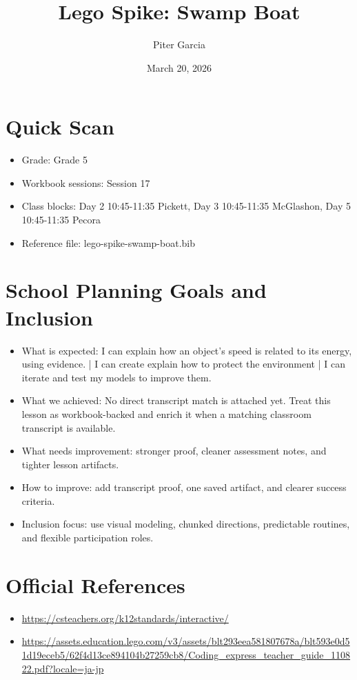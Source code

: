 \documentclass[11pt]{article}
\title{Lego Spike: Swamp Boat}
\author{Piter Garcia}
\date{March 20, 2026}
\begin{document}
    \maketitle
    \section*{Quick Scan}
    \begin{itemize}[leftmargin=*]
    \item Grade: Grade 5
    \item Workbook sessions: Session 17
    \item Class blocks: Day 2 10:45-11:35 Pickett, Day 3 10:45-11:35 McGlashon, Day 5 10:45-11:35 Pecora
    \item Reference file: lego-spike-swamp-boat.bib
    \end{itemize}
    \section*{School Planning Goals and Inclusion}
    \begin{itemize}[leftmargin=*]
    \item What is expected: I can explain how an object's speed is related to its energy, using evidence. | I can create explain how to protect the environment | I can iterate and test my models to improve them.
    \item What we achieved: No direct transcript match is attached yet. Treat this lesson as workbook-backed and enrich it when a matching classroom transcript is available.
    \item What needs improvement: stronger proof, cleaner assessment notes, and tighter lesson artifacts.
    \item How to improve: add transcript proof, one saved artifact, and clearer success criteria.
    \item Inclusion focus: use visual modeling, chunked directions, predictable routines, and flexible participation roles.
    \end{itemize}
    \section*{Official References}
    \begin{itemize}[leftmargin=*]
    \item \url{https://csteachers.org/k12standards/interactive/}
\item \url{https://assets.education.lego.com/v3/assets/blt293eea581807678a/blt593e0d51d19eceb5/62f4d13ce894104b27259cb8/Coding_express_teacher_guide_110822.pdf?locale=ja-jp}

    \end{itemize}
    
\end{document}
